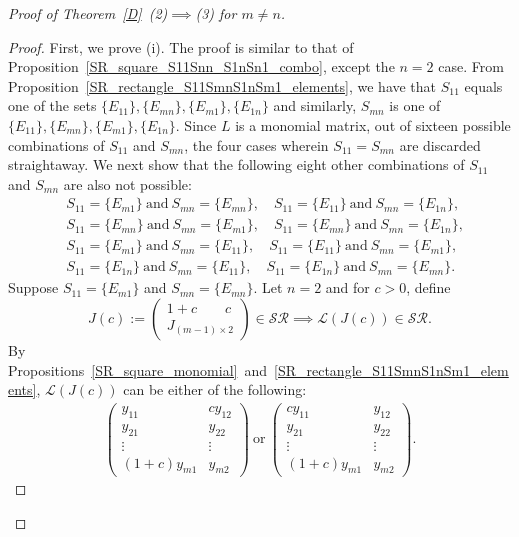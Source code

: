 \documentclass[11pt,reqno]{amsart}
\theoremstyle{plain}
\theoremstyle{definition}
\numberwithin{equation}{section}
\begin{document}
\begin{proof}[Proof of Theorem~\ref{D}~(2)$\implies$(3) for $m\neq n$]
	\begin{proof} First, we prove (i). The proof is similar to that
	of Proposition~\ref{SR_square_S11Snn_S1nSn1_combo}, except the $n=2$ case. From Proposition~\ref{SR_rectangle_S11SmnS1nSm1_elements}, we have that $S_{11}$ equals one of the sets $\{E_{11}\}, \{E_{mn}\}, \{E_{m1}\}, \{E_{1n}\}$ and similarly, $S_{mn}$ is one of $\{E_{11}\}, \{E_{mn}\}, \{E_{m1}\}, \{E_{1n}\}$. Since $L$ is a  monomial matrix, out of sixteen possible combinations of $S_{11}$ and $S_{mn}$, the four cases wherein $S_{11}=S_{mn}$ are discarded straightaway. We next show that the following eight other combinations of $S_{11}$ and $S_{mn}$ are also not possible:
	\begin{align*}
		&S_{11}=\{E_{m1}\} ~\text{and}~ S_{mn}=\{E_{mn}\}, \quad 
		S_{11}=\{E_{11}\} ~\text{and}~ S_{mn}=\{E_{1n}\}, \\
		&S_{11}=\{E_{mn}\} ~\text{and}~ S_{mn}=\{E_{m1}\}, \quad 
		S_{11}=\{E_{mn}\} ~\text{and}~ S_{mn}=\{E_{1n}\}, \\
		&S_{11}=\{E_{m1}\} ~\text{and}~ S_{mn}=\{E_{11}\}, \quad
		S_{11}=\{E_{11}\} ~\text{and}~ S_{mn}=\{E_{m1}\}, \\
		&S_{11}=\{E_{1n}\}~\text{and}~ S_{mn}=\{E_{11}\}, \quad
		S_{11}=\{E_{1n}\}~\text{and}~ S_{mn}=\{E_{mn}\}.
	\end{align*}
	Suppose $S_{11}=\{E_{m1}\}$ and $S_{mn}=\{E_{mn}\}$. Let $n=2$ and for $c>0$, define
		\[J(c):= \begin{pmatrix}
			1+c \qquad c \\
			J_{(m-1) \times 2}
		\end{pmatrix}\in \mathcal{SR}\implies \mathcal{L}(J(c))\in \mathcal{SR}.\]
	By Propositions~\ref{SR_square_monomial}~and~\ref{SR_rectangle_S11SmnS1nSm1_elements}, $\mathcal{L}(J(c))$ can be either of the following:
	\begin{align*}
		\begin{pmatrix}
			y_{11} & cy_{12} \\
			y_{21} & y_{22} \\
			\vdots & \vdots \\
			(1+c)y_{m1} & y_{m2}
		\end{pmatrix}~\text{or}~\begin{pmatrix}
			cy_{11} & y_{12} \\
			y_{21} & y_{22} \\
			\vdots & \vdots \\
			(1+c)y_{m1} & y_{m2}
		\end{pmatrix}.
	\end{align*}

\end{proof}
\end{proof}
\end{document}
